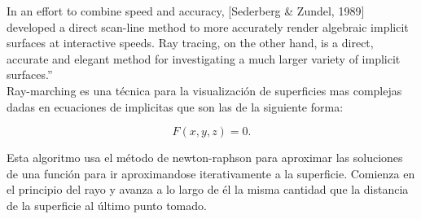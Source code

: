 In an effort to combine speed and accuracy, [Sederberg & Zundel, 1989] developed a direct scan-line method to more accurately render algebraic implicit surfaces at interactive speeds. Ray tracing, on the other hand, is a direct, accurate and elegant method for investigating a much larger variety of implicit surfaces.''
${ }$\\

Ray-marching es una técnica para la visualización de superficies mas complejas dadas en ecuaciones de implicitas que son las de la siguiente forma:

\[
F(x,y,z) = 0.
\]

Esta algoritmo usa el método de newton-raphson para aproximar las soluciones de una función para ir aproximandose iterativamente a la superficie. Comienza en el principio del rayo y avanza a lo largo de él la misma cantidad que la distancia de la superficie al último punto tomado.